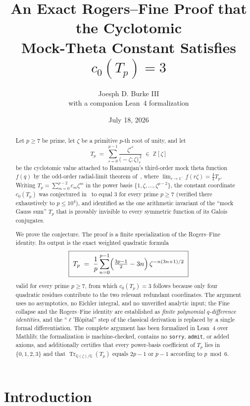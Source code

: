 \documentclass[11pt]{article}
\title{\bfseries An Exact Rogers--Fine Proof that the Cyclotomic\\ Mock-Theta Constant Satisfies $c_0(T_p)=3$}
\author{Joesph D. Burke III\\[2pt]
\normalsize with a companion Lean~4 formalization}
\date{July 18, 2026}
\theoremstyle{definition}
\DeclareMathOperator{\Tr}{Tr}
\newcommand{\Z}{\mathbb{Z}}
\newcommand{\Q}{\mathbb{Q}}
\begin{document}
\maketitle

\begin{abstract}
Let $p\ge 7$ be prime, let $\zeta$ be a primitive $p$-th root of unity, and let
\[
  T_p \;=\; \sum_{r=0}^{p-1}\frac{\zeta^{r^2}}{\bigl(-\zeta;\zeta\bigr)_r^{\,2}}\;\in\;\Z[\zeta]
\]
be the cyclotomic value attached to Ramanujan's third-order mock theta function $f(q)$ by the odd-order radial-limit theorem of~\cite{Burke2026}, where $\lim_{r\to1^-}f(r\zeta)=\tfrac43 T_p$. Writing $T_p=\sum_{m=0}^{p-2}c_m\zeta^m$ in the power basis $\{1,\zeta,\dots,\zeta^{p-2}\}$, the constant coordinate $c_0(T_p)$ was conjectured in~\cite{Burke2026} to equal $3$ for every prime $p\ge 7$ (verified there exhaustively to $p\le 10^4$), and identified as the one arithmetic invariant of the ``mock Gauss sum'' $T_p$ that is provably invisible to every symmetric function of its Galois conjugates.

We prove the conjecture. The proof is a finite specialization of the Rogers--Fine identity. Its output is the exact weighted quadratic formula
\[
  \boxed{\;T_p \;=\; \frac1p\sum_{n=0}^{p-1}\Bigl(\tfrac{3p-1}{2}-3n\Bigr)\,\zeta^{-n(3n+1)/2}\;}
\]
valid for every prime $p\ge 7$, from which $c_0(T_p)=3$ follows because only four quadratic residues contribute to the two relevant redundant coordinates. The argument uses no asymptotics, no Eichler integral, and no unverified analytic input; the Fine collapse and the Rogers--Fine identity are established as \emph{finite polynomial $q$-difference identities}, and the ``$\ell$'H\^opital'' step of the classical derivation is replaced by a single formal differentiation. The complete argument has been formalized in Lean~4 over Mathlib; the formalization is machine-checked, contains no \texttt{sorry}, \texttt{admit}, or added axioms, and additionally certifies that every power-basis coefficient of $T_p$ lies in $\{0,1,2,3\}$ and that $\Tr_{\Q(\zeta)/\Q}(T_p)$ equals $2p-1$ or $p-1$ according to $p\bmod 6$.
\end{abstract}

\tableofcontents

\section{Introduction}\label{sec:intro}
\end{document}
